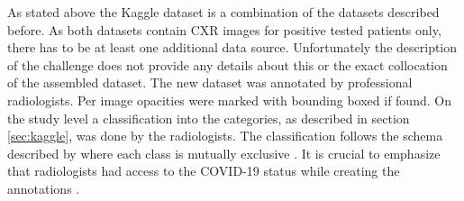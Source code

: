 As stated above the Kaggle dataset is a combination of the datasets described before. As both datasets contain CXR images for positive tested patients only, there has to be at least one additional data source. Unfortunately the description of the challenge does not provide any details about this or the exact collocation of the assembled dataset. The new dataset was annotated by professional radiologists. Per image opacities were marked with bounding boxed if found. On the study level a classification into the categories, as described in section \vref{sec:kaggle}, was done by the radiologists. The classification follows the schema described by \citeauthor{litmanovich2020review} where each class is mutually exclusive \autocite{litmanovich2020review}. It is crucial to emphasize that radiologists had access to the COVID-19 status while creating the annotations \autocite{SIIMKaggleAnnotation}.

